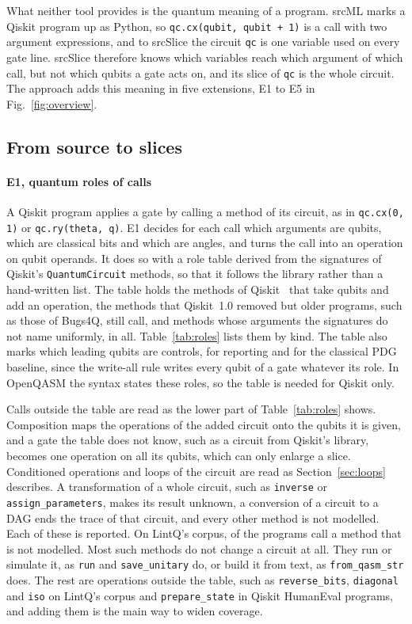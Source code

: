 What neither tool provides is the quantum meaning of a program. srcML marks a Qiskit program up as Python, so
\texttt{qc.cx(qubit, qubit + 1)} is a call with two argument expressions, and to srcSlice the circuit \texttt{qc} is
one variable used on every gate line. srcSlice therefore knows which variables reach which argument of which call,
but not which qubits a gate acts on, and its slice of \texttt{qc} is the whole circuit. The approach adds this
meaning in five extensions, E1 to E5 in Fig.~\ref{fig:overview}.

\subsection{From source to slices}
\paragraph*{E1, quantum roles of calls}
A Qiskit program applies a gate by calling a method of its circuit, as in \texttt{qc.cx(0, 1)} or \texttt{qc.ry(theta,
q)}. E1 decides for each call which arguments are qubits, which are classical bits and which are angles, and turns the
call into an operation on qubit operands. It does so with a role table derived from the signatures of Qiskit's
\texttt{QuantumCircuit} methods, so that it follows the library rather than a hand-written list. The table holds the
\numToolGateQiskit{} methods of Qiskit~\numQiskitVersion{} that take qubits and add an operation, the
\numToolGateLegacy{} methods that Qiskit~1.0 removed but older programs, such as those of Bugs4Q, still call, and
\numToolGateSpecial{} methods whose arguments the signatures do not name uniformly, \numToolGateTable{} in all.
Table~\ref{tab:roles} lists them by kind. The table also marks which leading qubits are controls, for reporting and
for the classical PDG baseline, since the write-all rule writes every qubit of a gate whatever its role. In OpenQASM
the syntax states these roles, so the table is needed for Qiskit only.

Calls outside the table are read as the lower part of Table~\ref{tab:roles} shows. Composition
maps the operations of the added circuit onto the qubits it is given, and a gate the table does not know, such as a
circuit from Qiskit's library, becomes one operation on all its qubits, which can only enlarge a slice. Conditioned
operations and loops of the circuit are read as Section~\ref{sec:loops} describes. A transformation of a whole
circuit, such as \texttt{inverse} or \texttt{assign\_parameters}, makes its result unknown, a conversion of a circuit
to a DAG ends the trace of that circuit, and every other method is not modelled. Each of these is reported. On LintQ's
corpus, \numUnmodMethodProgs{} of the \numSubjLintqCount{} programs call a method that is not modelled. Most such
methods do not change a circuit at all. They run or simulate it, as \texttt{run} and \texttt{save\_unitary} do, or
build it from text, as \texttt{from\_qasm\_str} does. The rest are operations outside the table, such as
\texttt{reverse\_bits}, \texttt{diagonal} and \texttt{iso} on LintQ's corpus and \texttt{prepare\_state} in
\numUnmodQhePrepare{} Qiskit HumanEval programs, and adding them is the main way to widen coverage.

